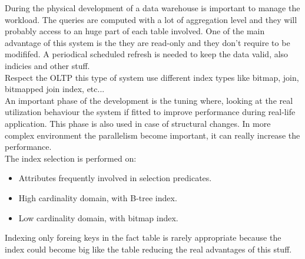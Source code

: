 \documentclass[12pt]{article}
\begin{document}
During the physical development of a data warehouse is important to manage the workload. The queries are computed with a lot of aggregation level and they will probably access to an huge part of each table involved. One of the main advantage of this system is the they are read-only and they don't require to be modififed. A periodical scheduled refresh is needed to keep the data valid, also indicies and other stuff.\\
Respect the OLTP this type of system use different index types like bitmap, join, bitmapped join index, etc...\\
An important phase of the development is the tuning where, looking at the real utilization behaviour the system if fitted to improve performance during real-life application. This phase is also used in case of structural changes. In more complex environment the parallelism become important, it can really increase the performance.\\
The index selection is performed on:
\begin{itemize}
  \item Attributes frequently involved in selection predicates.
  \item High cardinality domain, with B-tree index.
  \item Low cardinality domain, with bitmap index.
\end{itemize}
Indexing only foreing keys in the fact table is rarely appropriate because the index could become big like the table reducing the real advantages of this stuff.
\end{document}
